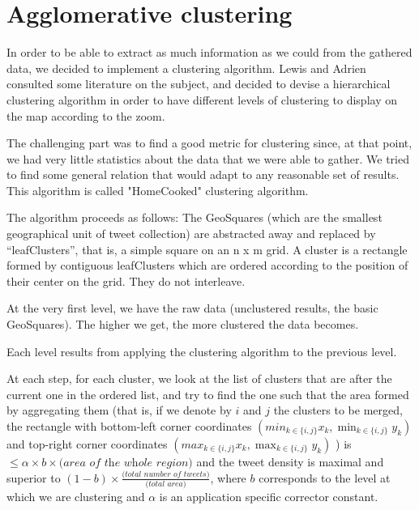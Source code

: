 \section{ Agglomerative clustering}
\label{sec:agg_clustering}
In order to be able to extract as much information as we could from the gathered data, we decided to implement a clustering algorithm. Lewis and Adrien consulted some literature on the subject, and decided to devise a hierarchical clustering algorithm in order to have different levels of clustering to display on the map according to the zoom. 

The challenging part was to find a good metric for clustering since, at that point, we had very little statistics about the data that we were able to gather. We tried to find some general relation that would adapt to any reasonable set of results. This algorithm is called "HomeCooked" clustering algorithm.

The algorithm proceeds as follows: 
The GeoSquares (which are the smallest geographical unit of tweet collection) are abstracted away and replaced by ``leafClusters'', that is, a simple square on an n x m grid. A cluster is a rectangle formed by contiguous leafClusters which are ordered according to the position of their center on the grid. They do not interleave. 

At the very first level, we have the raw data (unclustered results, the basic GeoSquares). The higher we get, the more clustered the data becomes. 

Each level results from applying the clustering algorithm to the previous level. 

At each step, for each cluster, we look at the list of clusters that are after the current one in the ordered list, and try to find the one such that the area formed by aggregating them (that is, if we denote by $i$ and $j$ the clusters to be merged, the rectangle with bottom-left corner coordinates $(min_{k\in \{i,j\} } x_k, \min_{k\in \{i,j\}} y_k )$ and top-right corner coordinates $(max_{k\in \{i,j\}} x_k, \max_{k\in \{i,j\} } y_k)$ ) is $\leq \alpha \times b \times \textit{(area of the whole region)}$ and the tweet density is maximal and superior to $(1-b)\times \frac{\textit{(total number of tweets)}}{\textit{(total area)}}$, where $b$ corresponds to the level at which we are clustering and $\alpha$ is an application specific corrector constant. 

